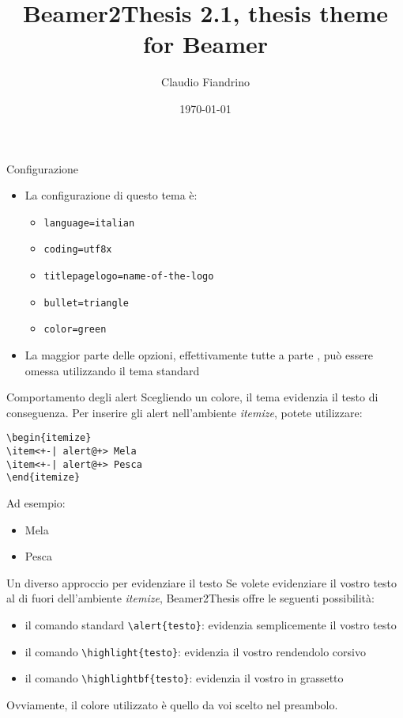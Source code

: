 \documentclass{beamer}
\author{Claudio Fiandrino}
\title{Beamer2Thesis 2.1, thesis theme for Beamer}
\date{\today}
\begin{document}


\begin{frame}[t,fragile]{Configurazione}
\begin{itemize}
\item La configurazione di questo tema è:
\begin{itemize}
\item \verb!language=italian!
\item \verb!coding=utf8x!
\item \verb!titlepagelogo=name-of-the-logo!
\item \verb!bullet=triangle!
\item \verb!color=green!
\end{itemize}
\item La maggior parte delle opzioni, effettivamente tutte a parte , può essere omessa utilizzando il tema standard
\end{itemize}
\end{frame}

\begin{frame}[fragile]{Comportamento degli alert}
Scegliendo un colore, il tema evidenzia il testo di conseguenza. Per inserire gli alert nell'ambiente \emph{itemize}, potete utilizzare:
\begin{verbatim}
\begin{itemize}
\item<+-| alert@+> Mela
\item<+-| alert@+> Pesca
\end{itemize}
\end{verbatim}
Ad esempio:
\begin{itemize}
\item<+-| alert@+> Mela
\item<+-| alert@+> Pesca
\end{itemize}
\end{frame}

\begin{frame}[fragile]{Un diverso approccio per evidenziare il testo}
Se volete evidenziare il vostro testo al di fuori dell'ambiente \emph{itemize}, Beamer2Thesis offre le seguenti possibilità:
\begin{itemize}
\item il comando standard \verb!\alert{testo}!: evidenzia semplicemente il vostro \alert{testo}
\item il comando \verb!\highlight{testo}!: evidenzia il vostro  rendendolo corsivo
\item il comando \verb!\highlightbf{testo}!: evidenzia il vostro  in grassetto
\end{itemize}
Ovviamente, il colore utilizzato è quello da voi scelto nel preambolo.
\end{frame}
\end{document}

